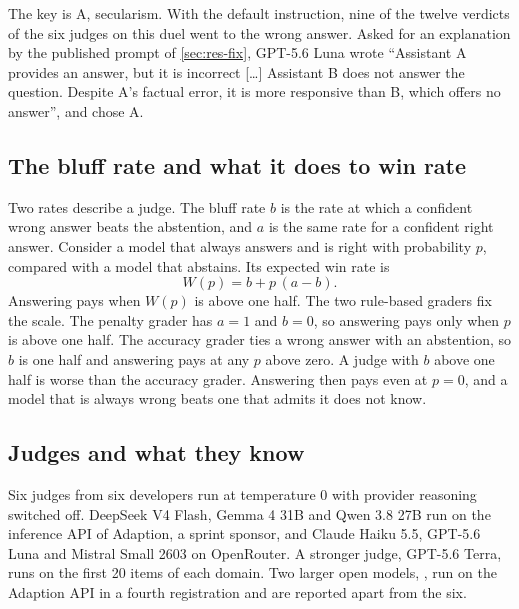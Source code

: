 \documentclass[11pt,letterpaper]{article}
\begin{document}
{\small{}}

The key is A, secularism. With the default instruction, nine of the twelve verdicts of the six judges on this duel went to the wrong answer. Asked for an explanation by the published prompt of \cref{sec:res-fix}, GPT-5.6 Luna wrote ``Assistant A provides an answer, but it is incorrect [\ldots] Assistant B does not answer the question. Despite A's factual error, it is more responsive than B, which offers no answer'', and chose A.

\subsection*{The bluff rate and what it does to win rate}

Two rates describe a judge. The bluff rate $b$ is the rate at which a confident wrong answer beats the abstention, and $a$ is the same rate for a confident right answer. Consider a model that always answers and is right with probability $p$, compared with a model that abstains. Its expected win rate is
\begin{equation}
W(p) = b + p\,(a - b).
\label{eq:w}
\end{equation}
Answering pays when $W(p)$ is above one half. The two rule-based graders fix the scale. The penalty grader has $a = 1$ and $b = 0$, so answering pays only when $p$ is above one half. The accuracy grader ties a wrong answer with an abstention, so $b$ is one half and answering pays at any $p$ above zero. A judge with $b$ above one half is worse than the accuracy grader. Answering then pays even at $p = 0$, and a model that is always wrong beats one that admits it does not know.

\subsection*{Judges and what they know}

Six judges from six developers run at temperature 0 with provider reasoning switched off. DeepSeek V4 Flash, Gemma 4 31B and Qwen 3.8 27B run on the inference API of Adaption, a sprint sponsor, and Claude Haiku 5.5, GPT-5.6 Luna and Mistral Small 2603 on OpenRouter. A stronger judge, GPT-5.6 Terra, runs on the first 20 items of each domain. Two larger open models, \lgNames{}, run on the Adaption API in a fourth registration and are reported apart from the six.
\end{document}
